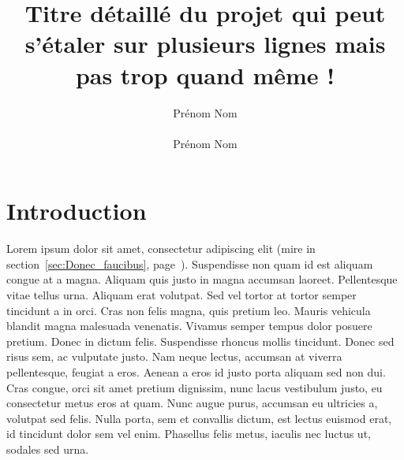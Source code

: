 \documentclass{EPUProjetDi}
\title[Titre court du projet]{Titre détaillé du projet qui peut s'étaler sur plusieurs lignes mais pas trop quand même !}
\author{Prénom Nom\\ %
\noindent[\url{prenom.nom@etu.univ-tours.fr}]\\
Prénom Nom\\ %
\noindent[\url{prenom.nom@etu.univ-tours.fr}]}
\begin{document}
\maketitle

\setcounter{page}{0}

{
\setlength{\parskip}{0em}

\tableofcontents


}


\start

\chapter*{Introduction}

Lorem ipsum dolor sit amet, consectetur adipiscing elit (mire in section~\ref{sec:Donec_faucibus}, page~\pageref{sec:Donec_faucibus}). Suspendisse non quam id est aliquam congue at a magna. Aliquam quis justo in magna accumsan laoreet. Pellentesque vitae tellus urna. Aliquam erat volutpat. Sed vel tortor at tortor semper tincidunt a in orci. Cras non felis magna, quis pretium leo. Mauris vehicula blandit magna malesuada venenatis. Vivamus semper tempus dolor posuere pretium. Donec in dictum felis. Suspendisse rhoncus mollis tincidunt. Donec sed risus sem, ac vulputate justo. Nam neque lectus, accumsan at viverra pellentesque, feugiat a eros. Aenean a eros id justo porta aliquam sed non dui. Cras congue, orci sit amet pretium dignissim, nunc lacus vestibulum justo, eu consectetur metus eros at quam. Nunc augue purus, accumsan eu ultricies a, volutpat sed felis. Nulla porta, sem et convallis dictum, est lectus euismod erat, id tincidunt dolor sem vel enim. Phasellus felis metus, iaculis nec luctus ut, sodales sed urna.
\end{document}
